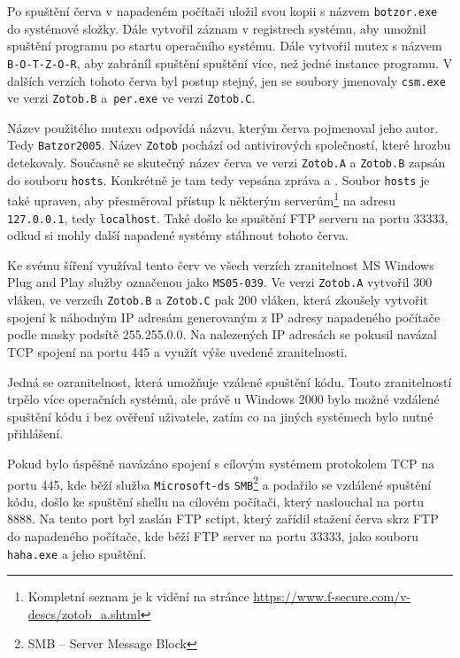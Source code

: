 \documentclass[a4paper,12pt]{article}
\begin{document}
Po spuštění červa v napadeném počítači uložil svou kopii s názvem \texttt{botzor.exe} do systémové složky\cite{zotob-fsecure}. Dále vytvořil záznam v registrech systému, aby umožnil spuštění programu po startu operačního systému. Dále vytvořil mutex s názvem \texttt{B-O-T-Z-O-R}, aby zabráníl spuštění spuštění více, než jedné instance programu. V dalších verzích tohoto červa byl postup stejný, jen se soubory jmenovaly \texttt{csm.exe} ve verzi \texttt{Zotob.B} a~\texttt{per.exe} ve verzi \texttt{Zotob.C}.

Název použitého mutexu odpovídá názvu, kterým červa pojmenoval jeho autor. Tedy \texttt{Batzor2005}. Název \texttt{Zotob} pochází od antivirových společností, které hrozbu detekovaly\cite{zotob-wikidot}. Současně se skutečný název červa ve verzi \texttt{Zotob.A} a \texttt{Zotob.B} zapsán do souboru \texttt{hosts}. Konkrétně je tam tedy vepsána zpráva  a \cite{zotob-fsecure}. Soubor \texttt{hosts} je také upraven, aby přesměroval přístup k některým serverům\footnote{Kompletní seznam je k vidění na stránce \url{https://www.f-secure.com/v-descs/zotob_a.shtml}} na adresu \texttt{127.0.0.1}, tedy \texttt{localhost}\cite{zotob-fsecure}. Také došlo ke spuštění FTP serveru na portu 33333, odkud si mohly další napadené systémy stáhnout tohoto červa\cite{zotob-fsecure}.

Ke svému šíření využíval tento červ ve všech verzích zranitelnost MS Windows Plug and Play služby označenou jako \texttt{MS05-039}\cite{zotob-fsecure}. Ve verzi \texttt{Zotob.A} vytvořil 300 vláken, ve verzcíh \texttt{Zotob.B} a \texttt{Zotob.C} pak 200 vláken, která zkoušely vytvořit spojení k náhodným IP adresám generovaným z IP adresy napadeného počítače podle masky podsítě 255.255.0.0\cite{zotob-fsecure}\cite{zotobb-fsecure}\cite{zotobc-fsecure}. Na nalezených IP adresách se pokusil navázal TCP spojení na portu 445 a využít výše uvedené zranitelnosti.

Jedná se ozranitelnost, která umožňuje vzálené spuštění kódu. Touto zranitelností trpělo více operačních systémů, ale právě u Windows 2000 bylo možné vzdálené spuštění kódu i bez ověření uživatele, zatím co na jiných systémech bylo nutné přihlášení\cite{zotob-ms}\cite{zotob-msbulletin}.

Pokud bylo úspěšně navázáno spojení s cílovým systémem protokolem TCP na portu 445, kde běží služba \texttt{Microsoft-ds} \texttt{SMB}\footnote{SMB -- Server Message Block} a podařilo se vzdálené spuštění kódu, došlo ke spuštění shellu na cílovém počítači, který naslouchal na portu 8888. Na tento port byl zaslán FTP sctipt, který zařídil stažení červa skrz FTP do napadeného počítače, kde běží FTP server na portu 33333, jako souboru \texttt{haha.exe} a jeho spuštění\cite{zotob-fsecure}\cite{zotobb-fsecure}.
\end{document}
